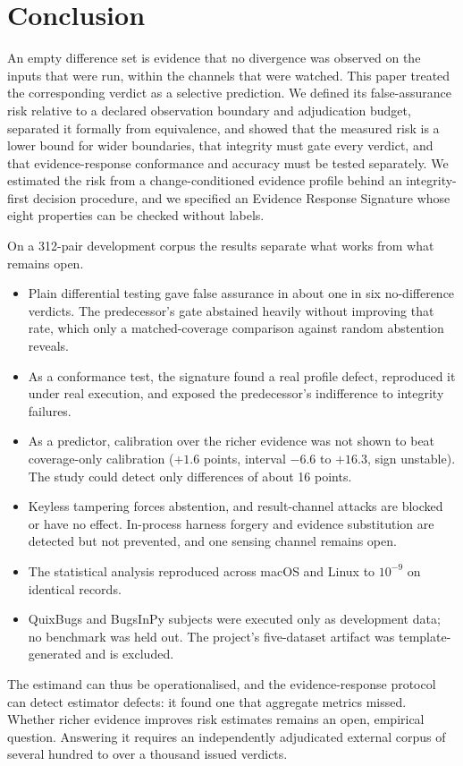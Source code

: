 \section{Conclusion}\label{sec:conclusion}

An empty difference set is evidence that no divergence was observed on the inputs that were run, within the channels that were watched. This paper treated the corresponding verdict as a selective prediction. We defined its false-assurance risk relative to a declared observation boundary and adjudication budget, separated it formally from equivalence, and showed that the measured risk is a lower bound for wider boundaries, that integrity must gate every verdict, and that evidence-response conformance and accuracy must be tested separately. We estimated the risk from a change-conditioned evidence profile behind an integrity-first decision procedure, and we specified an Evidence Response Signature whose eight properties can be checked without labels.

On a 312-pair development corpus the results separate what works from what remains open.
\begin{itemize}
\item Plain differential testing gave false assurance in about one in six no-difference verdicts. The predecessor's gate abstained heavily without improving that rate, which only a matched-coverage comparison against random abstention reveals.
\item As a conformance test, the signature found a real profile defect, reproduced it under real execution, and exposed the predecessor's indifference to integrity failures.
\item As a predictor, calibration over the richer evidence was not shown to beat coverage-only calibration ($+1.6$ points, interval $-6.6$ to $+16.3$, sign unstable). The study could detect only differences of about 16 points.
\item Keyless tampering forces abstention, and result-channel attacks are blocked or have no effect. In-process harness forgery and evidence substitution are detected but not prevented, and one sensing channel remains open.
\item The statistical analysis reproduced across macOS and Linux to $10^{-9}$ on identical records.
\item QuixBugs and BugsInPy subjects were executed only as development data; no benchmark was held out. The project's five-dataset artifact was template-generated and is excluded.
\end{itemize}

The estimand can thus be operationalised, and the evidence-response protocol can detect estimator defects: it found one that aggregate metrics missed. Whether richer evidence improves risk estimates remains an open, empirical question. Answering it requires an independently adjudicated external corpus of several hundred to over a thousand issued verdicts.
